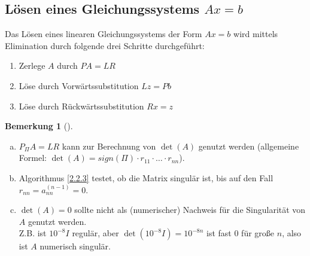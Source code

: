 \documentclass[ngerman,fontsize=11pt, paper=a4, parskip=half, titlepage=true, toc=bib]{scrbook}
\theoremstyle{definition}
\newtheorem{Bem}[Def]{Bemerkung}	%
\theoremstyle{plain}
\newcommand{\subsectione}[1]{\addtocounter{Def}{1}\subsection{#1}}
\newenvironment{Beme}[1][]{ %
  \begin{Bem}[#1]
  }
  {
  \end{Bem}
  \addtocounter{subsection}{1}
}
\begin{document}
\subsectione{Lösen eines Gleichungssystems $Ax=b$} 
Das Lösen eines linearen Gleichungssystems der Form $Ax=b$ wird mittels
Elimination durch folgende drei Schritte durchgeführt:
\begin{enumerate}[1)]
\item Zerlege $A$ durch $PA=LR$
\item Löse durch Vorwärtssubstitution $Lz=Pb$
\item Löse durch Rückwärtssubstitution $Rx=z$
\end{enumerate}

\begin{Beme}~
  \begin{enumerate}[a)]
  \item $P_\Pi A=LR$ kann zur Berechnung von $\det(A)$ genutzt werden
    (allgemeine Formel: $\det(A)=sign(\Pi)\cdot r_{11}\cdot \dots \cdot r_{nn}$).
  \item Algorithmus \ref{2.2.3}  testet, ob die Matrix singulär ist,
    bis auf den Fall $r_{nn}=a_{nn}^{(n-1)}=0$.
  \item $\det(A)=0$ sollte nicht als (numerischer) Nachweis für die
    Singularität von $A$ genutzt werden.\\
    Z.B. ist $10^{-8}I$ regulär, aber $\det(10^{-8}I) = 10^{-8n}$ ist fast 0
    für große $n$, also ist $A$ numerisch singulär.
  \end{enumerate}
\end{Beme}
\end{document}
